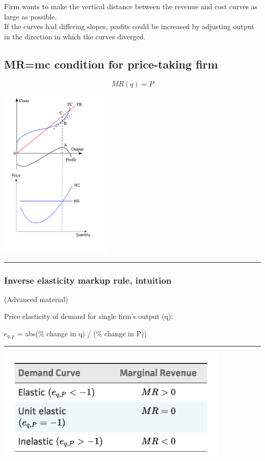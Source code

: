 \documentclass[]{article}
\begin{document}
Firm wants to make the vertical distance between the revenue and cost
curves as large as possible.\\
If the curves had differing slopes, profits could be increased by
adjusting output in the direction in which the curves diverged.

\hypertarget{mrmc-condition-for-price-taking-firm}{%
\subsection{MR=mc condition for price-taking
firm}\label{mrmc-condition-for-price-taking-firm}}

\[MR(q) = P\]

\includegraphics[width=5.5cm]{picsfigs/mcmr_tc_tr.png}

\begin{center}\rule{0.5\linewidth}{\linethickness}\end{center}

\hypertarget{inverse-elasticity-markup-rule-intuition}{%
\subsubsection{Inverse elasticity markup rule,
intuition}\label{inverse-elasticity-markup-rule-intuition}}

(Advanced material)

Price elasticity of demand for single firm's output (q):

\(e_{q,p}\) = abs(\% change in q) / (\% change in P))

\begin{center}\rule{0.5\linewidth}{\linethickness}\end{center}

\includegraphics[height=2.1in]{picsfigs/elast_vs_mr.png}
\end{document}
